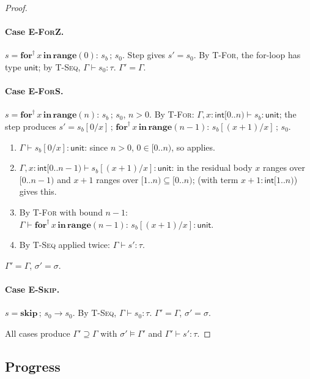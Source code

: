 \begin{proof}
\paragraph{Case \textsc{E-ForZ}.}
$s=\mathbf{for}^\dagger\,x\,\mathbf{in}\,\mathbf{range}(0):\,s_b\,;\,s_0$.
Step gives $s'=s_0$.
By \textsc{T-For}, the for-loop has type $\mathsf{unit}$; by \textsc{T-Seq},
$\Gamma\vdash s_0:\tau$.  $\Gamma'=\Gamma$.

\paragraph{Case \textsc{E-ForS}.}
$s=\mathbf{for}^\dagger\,x\,\mathbf{in}\,\mathbf{range}(n):\,s_b\,;\,s_0$,
$n>0$.
By \textsc{T-For}: $\Gamma,x{:}\mathsf{int}[0..n)\vdash s_b:\mathsf{unit}$;
the step produces
$s'=s_b[0/x]\,;\,
   \mathbf{for}^\dagger\,x\,\mathbf{in}\,\mathbf{range}(n{-}1):\,
   s_b[(x{+}1)/x]\,;\,s_0$.
\begin{enumerate}
\item $\Gamma\vdash s_b[0/x]:\mathsf{unit}$:
  since $n>0$, $0\in[0..n)$, so  applies.
\item $\Gamma,x{:}\mathsf{int}[0..n{-}1)\vdash s_b[(x{+}1)/x]:\mathsf{unit}$:
  in the residual body $x$ ranges over $[0..n{-}1)$ and $x{+}1$ ranges over
  $[1..n)\subseteq[0..n)$;  (with term
  $x{+}1:\mathsf{int}[1..n)$) gives this.
\item By \textsc{T-For} with bound $n{-}1$:
  $\Gamma\vdash
   \mathbf{for}^\dagger\,x\,\mathbf{in}\,\mathbf{range}(n{-}1):\,
   s_b[(x{+}1)/x]:\mathsf{unit}$.
\item By \textsc{T-Seq} applied twice: $\Gamma\vdash s':\tau$.
\end{enumerate}
$\Gamma'=\Gamma$, $\sigma'=\sigma$.

\paragraph{Case \textsc{E-Skip}.}
$s=\mathbf{skip}\,;\,s_0\to s_0$.
By \textsc{T-Seq}, $\Gamma\vdash s_0:\tau$.
$\Gamma'=\Gamma$, $\sigma'=\sigma$.

\smallskip
All cases produce $\Gamma'\supseteq\Gamma$ with
$\sigma'\models\Gamma'$ and $\Gamma'\vdash s':\tau$.
\end{proof}

\subsection{Progress}

